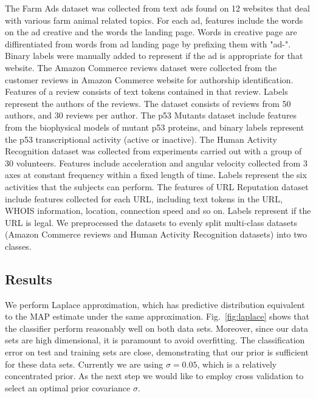 The Farm Ads dataset was collected from text ads found on 12 websites that deal with various farm animal related topics. For each ad, features include the words on the ad creative and the words the landing page. Words in creative page are diffirentiated from words from ad landing page by prefixing them with "ad-". Binary labels were manually added to represent if the ad is appropriate for that website. The Amazon Commerce reviews dataset were collected from the customer reviews in Amazon Commerce website for authorship identification. Features of a review consists of text tokens contained in that review. Labels represent the authors of the reviews. The dataset consists of reviews from 50 authors, and 30 reviews per author. The p53 Mutants dataset include features from the biophysical models of mutant p53 proteins, and binary labels represent the p53 transcriptional activity (active or inactive). The Human Activity Recognition dataset was collected from experiments carried out with a group of 30 volunteers. Features include acceleration and angular velocity collected from 3 axes at constant frequency within a fixed length of time. Labels represent the six activities that the subjects can perform. The features of URL Reputation dataset include features collected for each URL, including text tokens in the URL, WHOIS information, location, connection speed and so on. Labels represent if the URL is legal. We preprocessed the datasets to evenly split multi-class datasets (Amazon Commerce reviews and Human Activity Recognition datasets) into two classes.




\subsection{Results}

We perform Laplace approximation, which has predictive distribution equivalent
to the MAP estimate under the same approximation. Fig.~\ref{fig:laplace} shows
that the classifier perform reasonably well on both data sets. Moreover, since
our data sets are high dimensional, it is paramount to avoid overfitting. The
classification error on test and training sets are close, demonstrating that
our prior is sufficient for these data sets. Currently we are using $\sigma =
0.05$, which is a relatively concentrated prior. As the next step we would
like to employ cross validation to select an optimal prior covariance $\sigma$.

